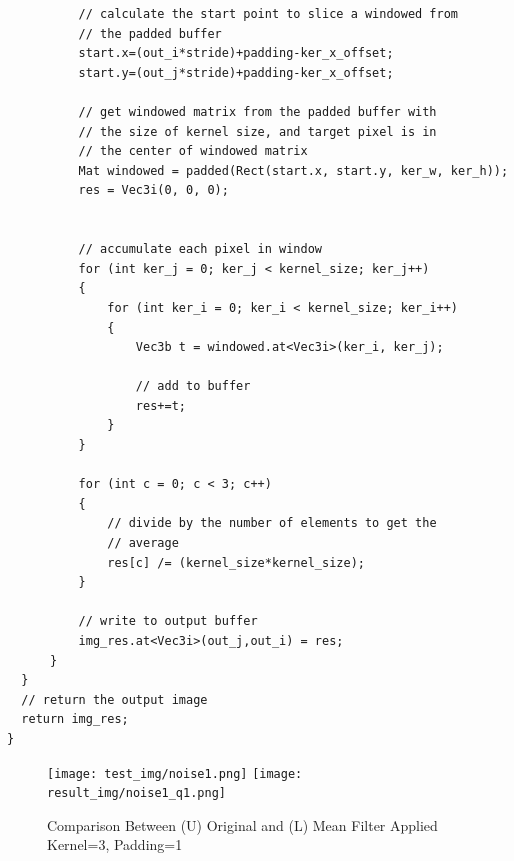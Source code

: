 \documentclass[12pt,a4paper]{report}
\begin{document}
\begin{lstlisting}
          // calculate the start point to slice a windowed from 
          // the padded buffer
          start.x=(out_i*stride)+padding-ker_x_offset;
          start.y=(out_j*stride)+padding-ker_x_offset;

          // get windowed matrix from the padded buffer with 
          // the size of kernel size, and target pixel is in
          // the center of windowed matrix
          Mat windowed = padded(Rect(start.x, start.y, ker_w, ker_h));
          res = Vec3i(0, 0, 0);


          // accumulate each pixel in window
          for (int ker_j = 0; ker_j < kernel_size; ker_j++)
          {
              for (int ker_i = 0; ker_i < kernel_size; ker_i++)
              {
                  Vec3b t = windowed.at<Vec3i>(ker_i, ker_j);
                  
                  // add to buffer
                  res+=t;
              }
          }

          for (int c = 0; c < 3; c++)
          {
              // divide by the number of elements to get the 
              // average
              res[c] /= (kernel_size*kernel_size);
          }

          // write to output buffer
          img_res.at<Vec3i>(out_j,out_i) = res;
      }
  }
  // return the output image
  return img_res;
}
\end{lstlisting}
\begin{figure}[!htb]
  \centering
  \texttt{[image: test\_img/noise1.png]}
  \texttt{[image: result\_img/noise1\_q1.png]}
  \caption{Comparison Between (U) Original and (L) Mean Filter Applied Kernel=3, Padding=1}
\end{figure}
\clearpage
\end{document}
